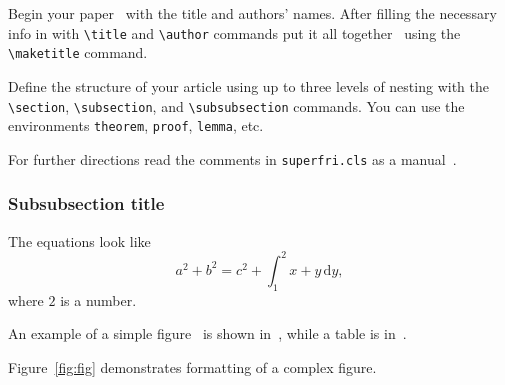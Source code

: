 \documentclass{superfri}
\begin{document}
Begin your paper~\cite{DBLP:series/cogtech/354089408} with the title and authors' names. After filling the
necessary info in with \verb=\title= and \verb=\author= commands put it all
together~\cite{SIV2008} using the \verb=\maketitle= command.

Define the structure of your article using up to three levels of nesting with
the \verb=\section=, \verb=\subsection=, and \verb=\subsubsection= commands.
You can use the environments \verb=theorem=, \verb=proof=, \verb=lemma=, etc.

For further directions read the comments in \verb=superfri.cls= as a manual~\cite{DBLP:journals/pcs/SokolinskyS16}.

\subsubsection{Subsubsection title}

The equations look like
\begin{equation}
a^2 + b^2 = c^2 + \int_1^2 x+y \, \mathrm{d}y,
\end{equation}
where $2$ is a number.

An example of a simple figure~\cite{DBLP:journals/corr/Zhang16b} is shown in~, while a table
is in~.


Figure~\ref{fig:fig} demonstrates formatting of a complex figure.
\end{document}

